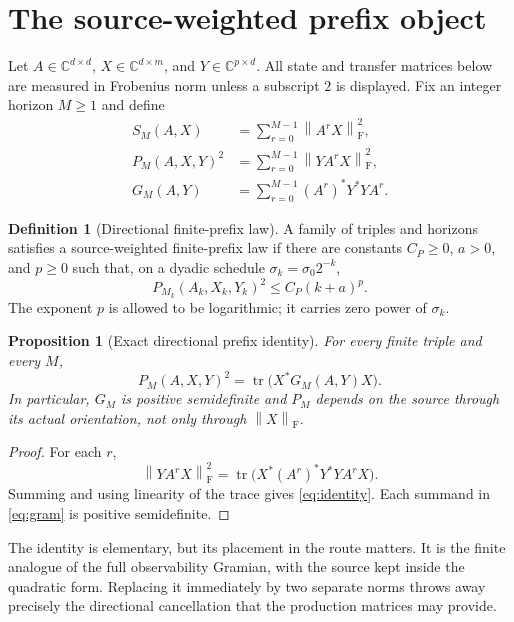 \documentclass[11pt]{article}
\newtheorem{proposition}[theorem]{Proposition}
\theoremstyle{definition}
\newtheorem{definition}[theorem]{Definition}
\theoremstyle{remark}
\newcommand{\norm}[1]{\left\lVert#1\right\rVert}
\newcommand{\F}{\mathrm F}
\newcommand{\tr}{\operatorname{tr}}
\begin{document}
\section{The source-weighted prefix object}
\label{sec:object}

Let $A\in\mathbb C^{d\times d}$, $X\in\mathbb C^{d\times m}$, and
$Y\in\mathbb C^{p\times d}$.  All state and transfer matrices below are
measured in Frobenius norm unless a subscript $2$ is displayed.  Fix an
integer horizon $M\ge1$ and define
\begin{align}
 S_M(A,X)&=\sum_{r=0}^{M-1}\norm{A^rX}_{\F}^2,
 \label{eq:source}\\
 P_M(A,X,Y)^2&=\sum_{r=0}^{M-1}\norm{YA^rX}_{\F}^2,
 \label{eq:prefix}\\
 G_M(A,Y)&=\sum_{r=0}^{M-1}(A^r)^*Y^*YA^r.
 \label{eq:gram}
\end{align}

\begin{definition}[Directional finite-prefix law]
 A family of triples and horizons satisfies a source-weighted finite-prefix
 law if there are constants $C_P\ge0$, $a>0$, and $p\ge0$ such that, on a
 dyadic schedule $\sigma_k=\sigma_0 2^{-k}$,
 \[
 P_{M_k}(A_k,X_k,Y_k)^2\le C_P(k+a)^p.
 \]
 The exponent $p$ is allowed to be logarithmic; it carries zero power of
 $\sigma_k$.
\end{definition}

\begin{proposition}[Exact directional prefix identity]
 \label{prop:identity}
 For every finite triple and every $M$,
 \begin{equation}
  P_M(A,X,Y)^2=\tr\!\bigl(X^*G_M(A,Y)X\bigr).
  \label{eq:identity}
 \end{equation}
 In particular, $G_M$ is positive semidefinite and $P_M$ depends on the
 source through its actual orientation, not only through $\norm X_{\F}$.
\end{proposition}

\begin{proof}
 For each $r$,
 \[
 \norm{YA^rX}_{\F}^2
 =\tr\!\bigl(X^*(A^r)^*Y^*YA^rX\bigr).
 \]
 Summing and using linearity of the trace gives \eqref{eq:identity}.  Each
 summand in \eqref{eq:gram} is positive semidefinite.
\end{proof}

The identity is elementary, but its placement in the route matters.  It is
the finite analogue of the full observability Gramian, with the source kept
inside the quadratic form.  Replacing it immediately by two separate norms
throws away precisely the directional cancellation that the production
matrices may provide.
\end{document}
